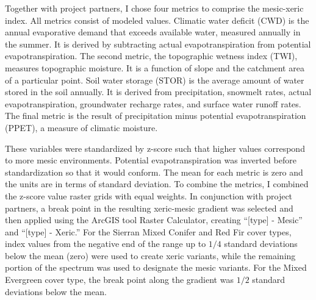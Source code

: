 Together with project partners, I chose four metrics to comprise the mesic-xeric index. All metrics consist of modeled values. Climatic water deficit (CWD) is the annual evaporative demand that exceeds available water, measured annually in the summer. It is derived by subtracting actual evapotranspiration from potential evapotranspiration. The second metric, the topographic wetness index (TWI), measures topographic moisture. It is a function of slope and the catchment area of a particular point. Soil water storage (STOR) is the average amount of water stored in the soil annually. It is derived from precipitation, snowmelt rates, actual evapotranspiration, groundwater recharge rates, and surface water runoff rates. The final metric is the result of precipitation minus potential evapotranspiration (PPET), a measure of climatic moisture.

These variables were standardized by z-score such that higher values correspond to more mesic environments. Potential evapotranspiration was inverted before standardization so that it would conform. The mean for each metric is zero and the units are in terms of standard deviation. To combine the metrics, I combined the z-score value raster grids with equal weights. In conjunction with project partners, a break point in the resulting xeric-mesic gradient was selected and then applied using the ArcGIS tool Raster Calculator, creating ``[type] - Mesic'' and ``[type] - Xeric.'' For the Sierran Mixed Conifer and Red Fir cover types, index values from the negative end of the range up to $1/4$ standard deviations below the mean (zero) were used to create xeric variants, while the remaining portion of the spectrum was used to designate the mesic variants. For the Mixed Evergreen cover type, the break point along the gradient was $1/2$ standard deviations below the mean. 



